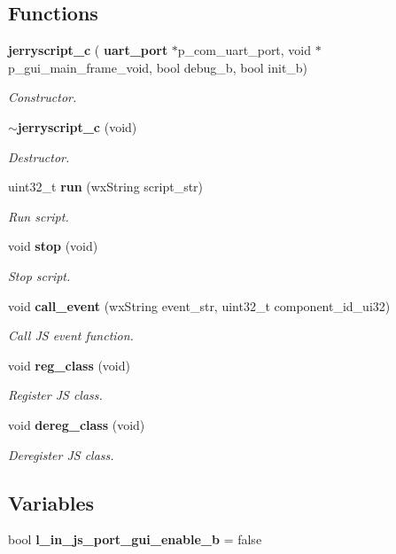 \subsection*{Functions}
\begin{DoxyCompactItemize}
\item 
\textbf{ jerryscript\+\_\+c} (\textbf{ uart\+\_\+port} $\ast$p\+\_\+com\+\_\+uart\+\_\+port, void $\ast$p\+\_\+gui\+\_\+main\+\_\+frame\+\_\+void, bool debug\+\_\+b, bool init\+\_\+b)
\begin{DoxyCompactList}\small\item\em Constructor. \end{DoxyCompactList}\item 
\textbf{ $\sim$jerryscript\+\_\+c} (void)
\begin{DoxyCompactList}\small\item\em Destructor. \end{DoxyCompactList}\item 
uint32\+\_\+t \textbf{ run} (wx\+String script\+\_\+str)
\begin{DoxyCompactList}\small\item\em Run script. \end{DoxyCompactList}\item 
void \textbf{ stop} (void)
\begin{DoxyCompactList}\small\item\em Stop script. \end{DoxyCompactList}\item 
void \textbf{ call\+\_\+event} (wx\+String event\+\_\+str, uint32\+\_\+t component\+\_\+id\+\_\+ui32)
\begin{DoxyCompactList}\small\item\em Call JS event function. \end{DoxyCompactList}\item 
void \textbf{ reg\+\_\+class} (void)
\begin{DoxyCompactList}\small\item\em Register JS class. \end{DoxyCompactList}\item 
void \textbf{ dereg\+\_\+class} (void)
\begin{DoxyCompactList}\small\item\em Deregister JS class. \end{DoxyCompactList}\end{DoxyCompactItemize}
\subsection*{Variables}
\begin{DoxyCompactItemize}
\item 
bool \textbf{ l\+\_\+in\+\_\+js\+\_\+port\+\_\+gui\+\_\+enable\+\_\+b} = false
\end{DoxyCompactItemize}


